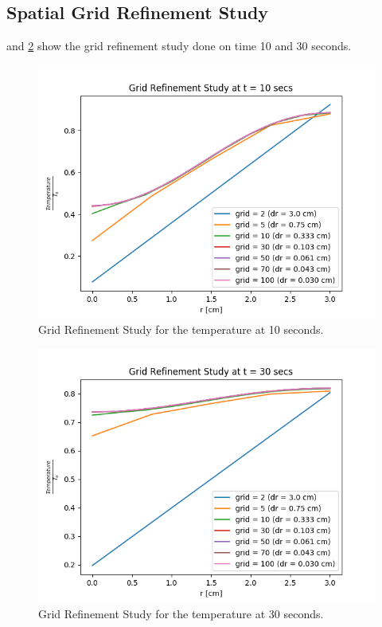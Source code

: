 \documentclass[12pt,letterpaper]{article}
\begin{document}
\subsection*{Spatial Grid Refinement Study}
 and \ref{fig:r_30s} show the grid refinement study
done on time 10 and 30 seconds.

\begin{figure}[htbp!]
  \begin{center}
    \includegraphics[scale=0.7]{grid_ref_10s.png}
  \end{center}
  \caption{Grid Refinement Study for the temperature at 10 seconds.}
  \label{fig:r_10s}
\end{figure}

\begin{figure}[htbp!]
  \begin{center}
    \includegraphics[scale=0.7]{grid_ref_30s.png}
  \end{center}
  \caption{Grid Refinement Study for the temperature at 30 seconds.}
  \label{fig:r_30s}
\end{figure}
\end{document}
